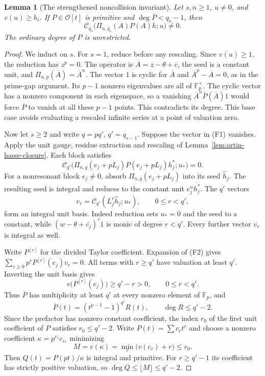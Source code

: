 \documentclass[11pt]{article}
\newtheorem{lemma}[theorem]{Lemma}
\begin{document}
\begin{lemma}[The strengthened noncollision invariant]
\label{lem:frobenius-noncollision}
Let $s,n\ge1$, $u\ne0$, and $v(u)\ge b_s$.
If $P\in\mathcal O[t]$ is primitive and
$\deg\overline P<q_s-1$, then
\[
 \mathcal C_{q_s}\bigl(\Pi_{n,q_s}(A)P(A)h;u\bigr)\ne0.
                                                               \tag{F1}
\]
The ordinary degree of $P$ is unrestricted.
\end{lemma}
\begin{proof}
We induct on $s$. For $s=1$, reduce before any rescaling.
Since $v(u)\ge1$, the reduction has $z^p=0$.
The operator is $\overline A=z-\theta+\overline c$, the seed is
a constant unit, and $\Pi_{n,p}(\overline A)=\overline A^n$.
The vector $1$ is cyclic for $\overline A$ and
$\overline A^p-\overline A=0$, as in the prime-gap argument.
Its $p-1$ nonzero eigenvalues are all of $\mathbb F_p^\times$.
The cyclic vector has a nonzero component in each eigenspace,
so a vanishing $\overline A^n\overline P(\overline A)1$ would
force $\overline P$ to vanish at all these $p-1$ points.
This contradicts its degree. This base case avoids evaluating a
rescaled infinite series at a point of valuation zero.

Now let $s\ge2$ and write $q=pq'$, $q'=q_{s-1}$.
Suppose the vector in (F1) vanishes.
Apply the unit gauge, residue extraction and rescaling of
Lemma~\ref{lem:artin-hasse-closure}. Each block satisfies
\[
 \mathcal C_{q'}\bigl(
 \Pi_{n,q}(e_j+pL_j)P(e_j+pL_j)h_j^*;u_*\bigr)=0.       \tag{F2}
\]
For a nonresonant block $e_j\ne0$, absorb
$\Pi_{n,q}(e_j+pL_j)$ into its seed $\widehat h_j$.
The resulting seed is integral and reduces to the constant unit
$e_j^n\overline{h_j^*}$.
The $q'$ vectors
\[
 v_r=\mathcal C_{q'}(L_j^r\widehat h_j;u_*),
                    \qquad 0\le r<q',
\]
form an integral unit basis. Indeed reduction sets $u_*=0$ and
the seed to a constant, while
$(w-\theta+\overline{c_j})^r1$ is monic of degree $r<q'$.
Every further vector $v_r$ is integral as well.

Write $P^{[r]}$ for the divided Taylor coefficient.
Expansion of (F2) gives
$\sum_{r\ge0}p^rP^{[r]}(e_j)v_r=0$.
All terms with $r\ge q'$ have valuation at least $q'$.
Inverting the unit basis gives
\[
 v\bigl(P^{[r]}(e_j)\bigr)\ge q'-r>0,\qquad 0\le r<q'.
\]
Thus $\overline P$ has multiplicity at least $q'$ at every
nonzero element of $\mathbb F_p$, and
\[
 \overline P(t)=(t^{p-1}-1)^{q'}R(t),\qquad
                 \deg R\le q'-2.
\]
Since the prefactor has nonzero constant coefficient, the index
$r_0$ of the first unit coefficient of $P$ satisfies $r_0\le q'-2$.
Write $P(t)=\sum c_rt^r$ and choose a nonzero coefficient
$\kappa=p^{r_*}c_{r_*}$ minimizing
\[
 M=v(\kappa)=\min_r\bigl(v(c_r)+r\bigr)\le r_0 .
\]
Then $Q(t)=P(pt)/\kappa$ is integral and primitive.
For $r\ge q'-1$ its coefficient has strictly positive valuation,
so $\deg\overline Q\le\lfloor M\rfloor\le q'-2$.


\end{proof}
\end{document}
